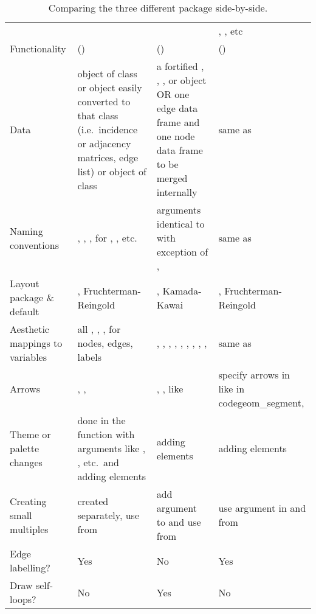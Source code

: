 \begin{table}
\begin{tabu} to \linewidth { X[l]| X[c] | X[c] | X[c] }
\toprule
&  &  & , , etc\\
Functionality & () & () &  () \\
\midrule
Data &  object of class  or object easily converted to that class (i.e.\ incidence or adjacency matrices, edge list) or object of class  & a fortified , , , or  object OR one edge data frame and one node data frame to be merged internally & same as \\
\midrule
Naming conventions & ,  , ,  for , , etc.\ & arguments identical to  with exception of ,  & same as \\
\midrule
Layout package \& default & , Fruchterman-Reingold & , Kamada-Kawai & , Fruchterman-Reingold\\
\midrule
Aesthetic mappings to variables & all , , ,  for nodes, edges, labels & , , , , , , , , ,  & same as  \\
\midrule
Arrows & , ,  & , ,  like  & specify arrows in  like in code{geom\_segment},  \\
\midrule
Theme or palette changes & done in the function with arguments like , , etc.\ and adding  elements  & adding  elements & adding  elements \\
\midrule
Creating small multiples  & created separately, use  from  & add  argument to  and use  from  & use  argument in  and  from \\
\midrule
Edge labelling? & Yes  & No & Yes\\
\midrule
Draw self-loops? &  No & Yes & No \\
\bottomrule
\end{tabu}
\caption{\label{tab:comparison} Comparing the three different package side-by-side. }
\end{table}

